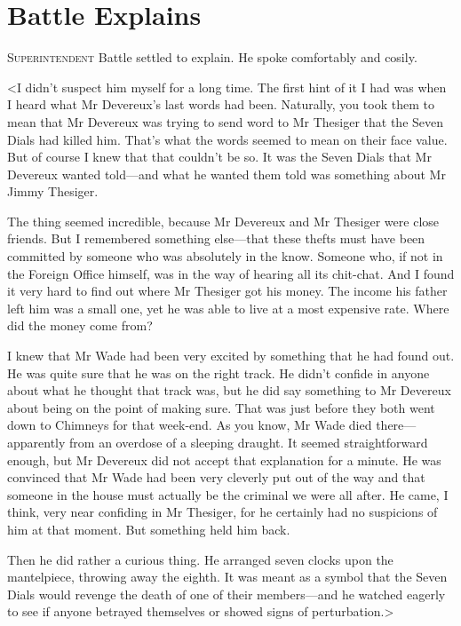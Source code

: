 \chapter{Battle Explains}

\lettrine{S}{uperintendent} Battle settled to explain. He spoke comfortably and cosily.

\zz
<I didn't suspect him myself for a long time. The first hint of it I had was when I heard what Mr Devereux's last words had been. Naturally, you took them to mean that Mr Devereux was trying to send word to Mr Thesiger that the Seven Dials had killed him. That's what the words seemed to mean on their face value. But of course I knew that that couldn't be so. It was the Seven Dials that Mr Devereux wanted told—and what he wanted them told was something about Mr Jimmy Thesiger.

The thing seemed incredible, because Mr Devereux and Mr Thesiger were close friends. But I remembered something else—that these thefts must have been committed by someone who was absolutely in the know. Someone who, if not in the Foreign Office himself, was in the way of hearing all its chit-chat. And I found it very hard to find out where Mr Thesiger got his money. The income his father left him was a small one, yet he was able to live at a most expensive rate. Where did the money come from?

I knew that Mr Wade had been very excited by something that he had found out. He was quite sure that he was on the right track. He didn't confide in anyone about what he thought that track was, but he did say something to Mr Devereux about being on the point of making sure. That was just before they both went down to Chimneys for that week-end. As you know, Mr Wade died there—apparently from an overdose of a sleeping draught. It seemed straightforward enough, but Mr Devereux did not accept that explanation for a minute. He was convinced that Mr Wade had been very cleverly put out of the way and that someone in the house must actually be the criminal we were all after. He came, I think, very near confiding in Mr Thesiger, for he certainly had no suspicions of him at that moment. But something held him back.

Then he did rather a curious thing. He arranged seven clocks upon the mantelpiece, throwing away the eighth. It was meant as a symbol that the Seven Dials would revenge the death of one of their members—and he watched eagerly to see if anyone betrayed themselves or showed signs of perturbation.>

